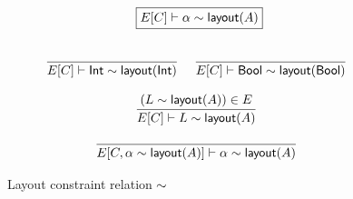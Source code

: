 \begin{figure}
  \[
    \begin{array}{c}
      \fbox{$E[C] \vdash \alpha \isA \layout{A}$}
      \\\\\\
      \labinfer{E[C] \vdash \Int \isA \layout{\Int}}{}
      ~~~
      \labinfer{E[C] \vdash \Bool \isA \layout{\Bool}}{}
      \\\\
      \labinfer{E[C] \vdash L \isA \layout{A}}{(L \isA \layout{A}) \in E}
      \\\\
      \labinfer{E[C, \alpha \isA \layout{A}] \vdash \alpha \isA \layout{A}}{}
    \end{array}
  \]
  \caption{Layout constraint relation $\sim$}
  \label{fig:layout-constraints}
\end{figure}

